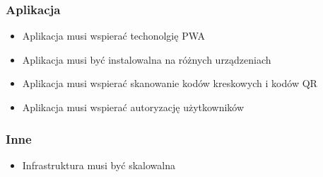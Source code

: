 \documentclass[../main.tex]{subfiles}
\begin{document}
        \subsubsection*{Aplikacja}
            \begin{itemize}
                \item Aplikacja musi wspierać techonolgię PWA
                \item Aplikacja musi być instalowalna na różnych urządzeniach
                \item Aplikacja musi wspierać skanowanie kodów kreskowych i kodów QR
                \item Aplikacja musi wspierać autoryzację użytkowników
            \end{itemize}
        \subsubsection*{Inne}
            \begin{itemize}
                \item Infrastruktura musi być skalowalna
            \end{itemize}
\end{document}
